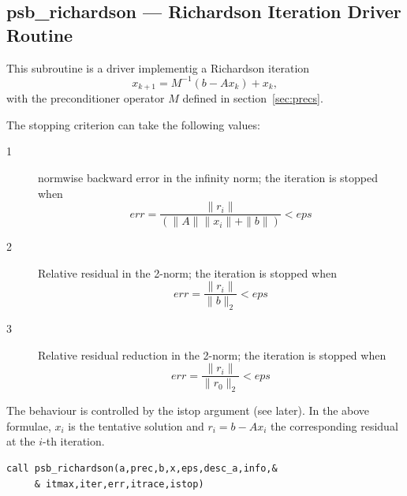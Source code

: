 \clearpage\subsection{psb\_richardson \label{richardson} ---
  Richardson Iteration Driver    Routine}

This subroutine is a driver implementig a Richardson iteration
\[ x_{k+1} = M^{-1} (b-Ax_k) +x_k,\] 
with the preconditioner operator $M$ defined in section~\ref{sec:precs}. 

The stopping criterion can take the following values:
\begin{description}
\item[1]  normwise backward error  in the infinity
norm;  the iteration is stopped when 
\[ err = \frac{\|r_i\|}{(\|A\|\|x_i\|+\|b\|)} < eps \]
\item[2] Relative residual in the 2-norm; the iteration is stopped
when
\[ err = \frac{\|r_i\|}{\|b\|_2} < eps \]
\item[3] Relative residual reduction in the 2-norm; the iteration is stopped
when
\[ err = \frac{\|r_i\|}{\|r_0\|_2} < eps \]
\end{description}
The behaviour is controlled by  the  istop argument (see
later). In the above formulae, $x_i$ is the tentative solution and
$r_i=b-Ax_i$ the corresponding residual at the $i$-th iteration. 


\begin{lstlisting}
call psb_richardson(a,prec,b,x,eps,desc_a,info,&
     & itmax,iter,err,itrace,istop)
\end{lstlisting}

